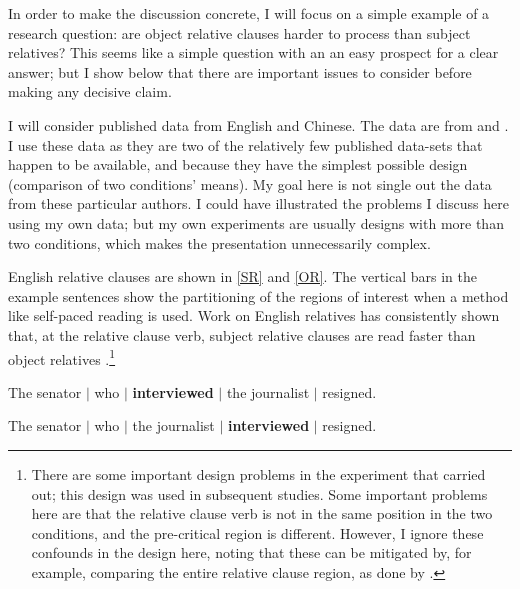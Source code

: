 \documentclass{ar-1col}\usepackage[]{graphicx}\usepackage[]{color}
\begin{document}
In order to make the discussion concrete, I will focus on a simple example of a research question: are object relative clauses harder to process than subject relatives? This seems like a simple question with an an easy prospect for a clear answer; but I show below that there are important issues to consider before making any decisive claim. 

I will consider published data from English and Chinese. The data are from \citet{grodner} and  \citet{gibsonwu}. I use these data as they are two of the relatively few published data-sets that happen to be available, and because they have the simplest possible design (comparison of two conditions' means).  My goal here is not single out the data from these particular authors. I could have illustrated the problems I discuss here using my own data; but my own experiments are usually designs with more than two conditions, which makes the presentation unnecessarily complex. 


English relative clauses are shown in \ref{SR} and \ref{OR}. The vertical bars in the example sentences show the partitioning of the regions of interest when a method like self-paced reading is used. 
Work on English relatives  has consistently shown that, at the relative clause verb, subject relative clauses are read faster than object relatives  \citep[e.g.,][]{jc92,grodner,gibson2005rrc,gordon01,fedorenko2006nature}.\footnote{There are some important design problems in the experiment that \citet{jc92} carried out; this design was used in subsequent studies. Some important problems here are that the relative clause verb is not in the same position in the two conditions, and the pre-critical region is different. However, I ignore these confounds in the design here, noting that these can be mitigated by, for example, comparing the entire relative clause region, as done by \citet{fedorenko2006nature}.}

\begin{exe}
\ex
\begin{xlist}
\item \label{SR}      
The senator $\mid$ who $\mid$ \textbf{interviewed} $\mid$ the journalist $\mid$ resigned.
\item \label{OR} 
The senator $\mid$ who $\mid$ the journalist $\mid$ \textbf{interviewed} $\mid$ resigned.
\end{xlist}
\end{exe}
\end{document}
